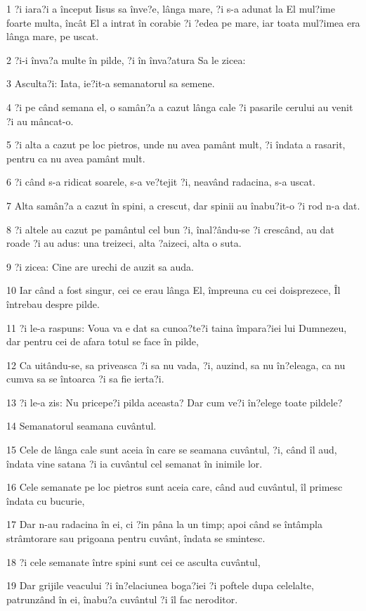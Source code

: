 \par 1 ?i iara?i a început Iisus sa înve?e, lânga mare, ?i s-a adunat la El mul?ime foarte multa, încât El a intrat în corabie ?i ?edea pe mare, iar toata mul?imea era lânga mare, pe uscat.
\par 2 ?i-i înva?a multe în pilde, ?i în înva?atura Sa le zicea:
\par 3 Asculta?i: Iata, ie?it-a semanatorul sa semene.
\par 4 ?i pe când semana el, o samân?a a cazut lânga cale ?i pasarile cerului au venit ?i au mâncat-o.
\par 5 ?i alta a cazut pe loc pietros, unde nu avea pamânt mult, ?i îndata a rasarit, pentru ca nu avea pamânt mult.
\par 6 ?i când s-a ridicat soarele, s-a ve?tejit ?i, neavând radacina, s-a uscat.
\par 7 Alta samân?a a cazut în spini, a crescut, dar spinii au înabu?it-o ?i rod n-a dat.
\par 8 ?i altele au cazut pe pamântul cel bun ?i, înal?ându-se ?i crescând, au dat roade ?i au adus: una treizeci, alta ?aizeci, alta o suta.
\par 9 ?i zicea: Cine are urechi de auzit sa auda.
\par 10 Iar când a fost singur, cei ce erau lânga El, împreuna cu cei doisprezece, Îl întrebau despre pilde.
\par 11 ?i le-a raspuns: Voua va e dat sa cunoa?te?i taina împara?iei lui Dumnezeu, dar pentru cei de afara totul se face în pilde,
\par 12 Ca uitându-se, sa priveasca ?i sa nu vada, ?i, auzind, sa nu în?eleaga, ca nu cumva sa se întoarca ?i sa fie ierta?i.
\par 13 ?i le-a zis: Nu pricepe?i pilda aceasta? Dar cum ve?i în?elege toate pildele?
\par 14 Semanatorul seamana cuvântul.
\par 15 Cele de lânga cale sunt aceia în care se seamana cuvântul, ?i, când îl aud, îndata vine satana ?i ia cuvântul cel semanat în inimile lor.
\par 16 Cele semanate pe loc pietros sunt aceia care, când aud cuvântul, îl primesc îndata cu bucurie,
\par 17 Dar n-au radacina în ei, ci ?in pâna la un timp; apoi când se întâmpla strâmtorare sau prigoana pentru cuvânt, îndata se smintesc.
\par 18 ?i cele semanate între spini sunt cei ce asculta cuvântul,
\par 19 Dar grijile veacului ?i în?elaciunea boga?iei ?i poftele dupa celelalte, patrunzând în ei, înabu?a cuvântul ?i îl fac neroditor.
